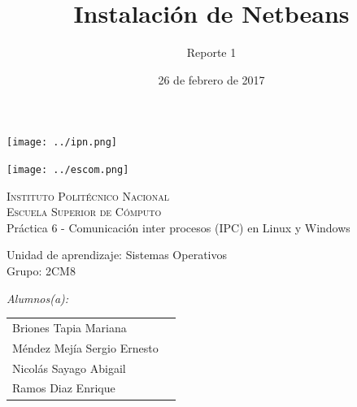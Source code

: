 \documentclass[12pt]{article}
\date{26 de febrero de 2017}
\title{Instalación de Netbeans}
\author{Reporte 1}
\begin{document}
    \begin{titlepage}
      \begin{center}
        
        
        \noindent
        \begin{minipage}{0.5\textwidth}
          \begin{flushleft} \large
            \texttt{[image: ../ipn.png]}
          \end{flushleft}
        \end{minipage}%
        \begin{minipage}{0.55\textwidth}
          \begin{flushright} \large
            \texttt{[image: ../escom.png]}
          \end{flushright}
        \end{minipage}
        
        \textsc{\LARGE Instituto Politécnico Nacional}\\[0.5cm]
        
        \textsc{\Large Escuela Superior de Cómputo}\\[1cm]
        
        
        { \huge Práctica 6 - Comunicación inter procesos (IPC) en Linux y Windows \\[1cm] }
        
        { \Large Unidad de aprendizaje: Sistemas Operativos} \\[1cm]
        
        { \Large Grupo: 2CM8 } \\[1cm]
        
        \noindent
        \begin{minipage}{0.5\textwidth}
          \begin{flushleft} \large
            \emph{Alumnos(a):}\\
            
            \begin{tabular}{ll}
             Briones Tapia Mariana \\
             Méndez Mejía Sergio Ernesto \\
             Nicolás Sayago Abigail\\
             Ramos Diaz Enrique \\
               

\end{tabular}
\end{flushleft}
\end{minipage}
\end{center}
\end{titlepage}
\end{document}

